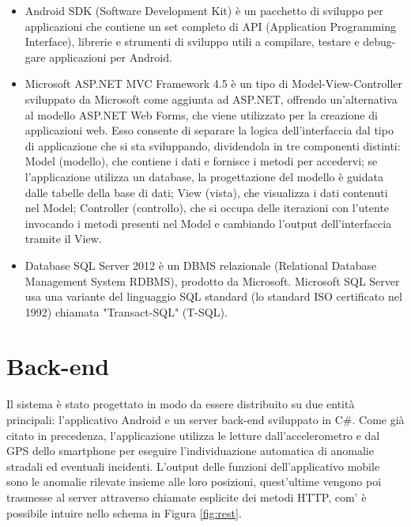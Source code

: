 \documentclass[a4paper, 11pt]{article} %
\begin{document}
\begin{itemize}
	\item Android SDK (Software Development Kit) è un pacchetto di sviluppo per applicazioni che contiene un set completo di API (Application Programming Interface), librerie e strumenti di sviluppo utili a compilare, testare e debug-gare applicazioni per Android.
	
	\item Microsoft ASP.NET MVC Framework 4.5  è un tipo di Model-View-Controller sviluppato da Microsoft come aggiunta ad ASP.NET, offrendo un'alternativa al modello ASP.NET Web Forms, che viene utilizzato per la creazione di applicazioni web. Esso consente di separare la logica dell’interfaccia dal tipo di applicazione che si sta sviluppando, dividendola in tre componenti distinti: Model (modello), che contiene i dati e fornisce i metodi per accedervi; se l’applicazione utilizza un database, la progettazione del modello è guidata dalle tabelle della base di dati; View (vista), che visualizza i dati contenuti nel Model; Controller (controllo), che si occupa delle iterazioni con l’utente invocando i metodi presenti nel Model e cambiando l’output dell’interfaccia tramite il View.
	
	\item Database SQL Server 2012 è un DBMS relazionale (Relational Database Management System RDBMS), prodotto da Microsoft. Microsoft SQL Server usa una variante del linguaggio SQL standard (lo standard ISO certificato nel 1992) chiamata "Transact-SQL" (T-SQL).
\end{itemize}

\section{Back-end}
Il sistema è stato progettato in modo da essere distribuito su due entità principali: l'applicativo Android e un server back-end sviluppato in C\#. Come già citato in precedenza, l'applicazione utilizza le letture dall'accelerometro e dal GPS dello smartphone per eseguire l'individuazione automatica di anomalie stradali ed eventuali incidenti. L'output delle funzioni dell'applicativo mobile sono le anomalie rilevate insieme alle loro posizioni, quest'ultime vengono poi trasmesse al server attraverso chiamate esplicite dei metodi HTTP, com’ è possibile intuire nello schema in Figura \ref{fig:rest}.
\end{document}
